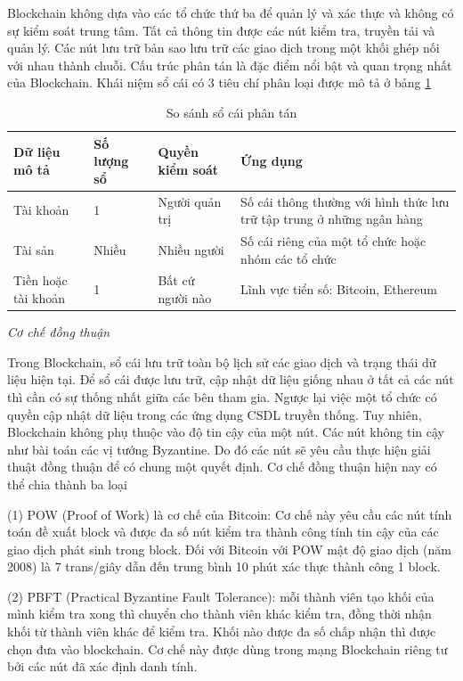 Blockchain không dựa vào các tổ chức thứ ba để quản lý và xác thực và không có sự kiểm soát trung tâm.
Tất cả thông tin được các nút kiểm tra, truyền tải và quản lý. 
Các nút lưu trữ bản sao lưu trữ các giao dịch trong một khối ghép nối với nhau thành chuỗi.
Cấu trúc phân tán là đặc điểm nổi bật và quan trọng nhất của Blockchain.
Khái niệm sổ cái có 3 tiêu chí phân loại được mô tả ở bảng \ref{table:ex-dlt} 
\begin{table}
\caption{So sánh sổ cái phân tán}
	\label{table:ex-dlt}
	\begin{tabularx} {\textwidth} {|X|X|X|p{5cm}|}
\hline
	Dữ liệu mô tả & Số lượng sổ & Quyền kiểm soát & Ứng dụng \\ \hline
	Tài khoản  & 1 & Người quản trị & Số cái thông thường với hình thức lưu trữ tập trung ở những ngân hàng\\ \hline
	Tài sản   & Nhiều  &  Nhiều người & Số cái riêng của một tổ chức hoặc nhóm các tổ chức\\ \hline
	Tiền hoặc tài khoản   &  1 & Bất cứ người nào & Lĩnh vực tiển số: Bitcoin, Ethereum \\ \hline
\end{tabularx}
\end{table}

\emph{Cơ chế đồng thuận}

Trong Blockchain, sổ cái lưu trữ toàn bộ lịch sử các giao dịch và trạng thái dữ liệu hiện tại.
Để sổ cái được lưu trữ, cập nhật dữ liệu giống nhau ở tất cả các nút thì cần có sự thống nhất giữa các bên tham gia. Ngược lại việc một tổ chức có quyền cập nhật dữ liệu trong các ứng dụng CSDL truyền thống.
Tuy nhiên, Blockchain không phụ thuộc vào độ tin cậy của một nút. Các nút không tin cậy như bài toán các vị tướng Byzantine. Do đó các nút sẽ yêu cầu thực hiện giải thuật đồng thuận để có chung một quyết định.
Cơ chế đồng thuận hiện nay có thể chia thành ba loại \cite{lequyetthang2016}

(1) POW (Proof of Work) là cơ chế của Bitcoin:
Cơ chế này yêu cầu các nút tính toán đề xuất block và được đa số nút kiểm tra thành công tính tin cậy của các giao dịch phát sinh trong block. Đối với Bitcoin với POW mật độ giao dịch (năm 2008) là 7 trans/giây dẫn đến trung bình 10 phút xác thực thành công 1 block. 

(2) PBFT (Practical Byzantine Fault Tolerance): mỗi thành viên tạo khối của mình kiểm tra xong thì chuyển cho thành viên khác kiểm tra, đồng thời nhận khối từ thành viên khác để kiểm tra. Khối nào được đa số chấp nhận thì được chọn đưa vào blockchain. 
Cơ chế này được dùng trong mạng Blockchain riêng tư bởi các nút đã xác định danh tính.


